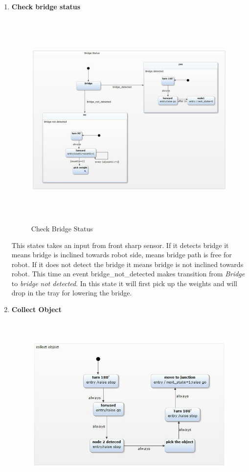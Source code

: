 \documentclass[a4paper,12pt,oneside]{article}
\begin{document}
\newpage
\begin{enumerate}
\item \textbf{Check bridge status}\\
\begin{figure}[H]
\centering
\includegraphics[width=16cm,height=11cm]{53.jpg}
\caption{Check Bridge Status}
\end{figure}
This states takes an input from front sharp sensor. If it detects bridge it means bridge is inclined towards robot side, means bridge path is free for robot. If it does not detect the bridge it means bridge is not inclined towards robot. This time an event {bridge\_not\_detected} makes transition from \emph{Bridge} to \emph{bridge not detected}. In this state  it will first pick up the weights and will drop in the tray for lowering the bridge.
\newpage
\item \textbf{Collect Object}\\
\begin{figure}[H]
\centering
\includegraphics[width=14cm,height=9cm]{54.jpg}

\end{figure}
\end{enumerate}
\end{document}
